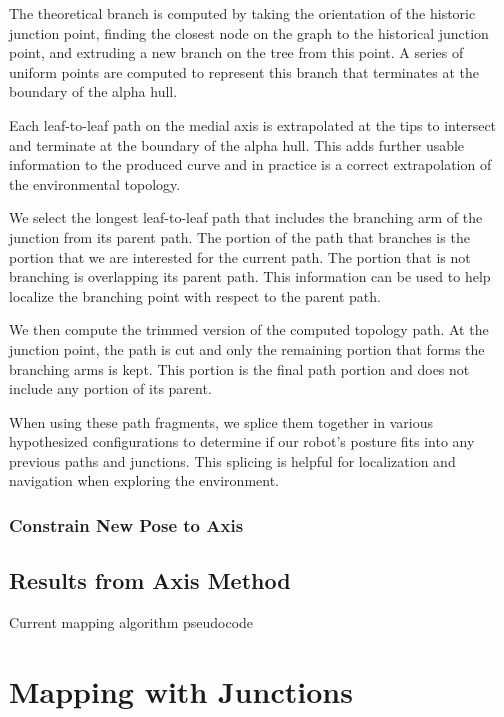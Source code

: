 The theoretical branch is computed by taking the orientation of the historic junction point, finding the closest node on the graph to the historical junction point, and extruding a new branch on the tree from this point. A series of uniform points are computed to represent this branch that terminates at the boundary of the alpha hull.

Each leaf-to-leaf path on the medial axis is extrapolated at the tips to intersect and terminate at the boundary of the alpha hull. This adds further usable information to the produced curve and in practice is a correct extrapolation of the environmental topology. 

We select the longest leaf-to-leaf path that includes the branching arm of the junction from its parent path. The portion of the path that branches is the portion that we are interested for the current path. The portion that is not branching is overlapping its parent path. This information can be used to help localize the branching point with respect to the parent path.

We then compute the trimmed version of the computed topology path. At the junction point, the path is cut and only the remaining portion that forms the branching arms is kept. This portion is the final path portion and does not include any portion of its parent. 

When using these path fragments, we splice them together in various hypothesized configurations to determine if our robot's posture fits into any previous paths and junctions. This splicing is helpful for localization and navigation when exploring the environment.

\subsection{Constrain New Pose to Axis}
\label{constrainnewposetoaxis}

\section{Results from Axis Method}
\label{resultsfromaxismethod}

Current mapping algorithm pseudocode

\pagebreak 

\chapter{Mapping with Junctions}
\label{mappingwithjunctions}

